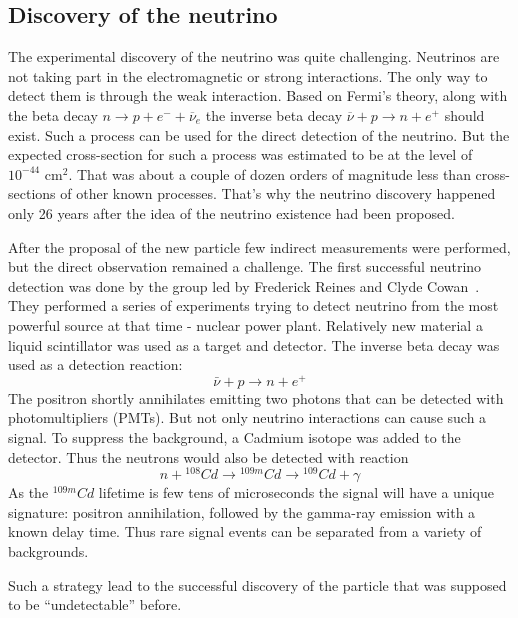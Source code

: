 \documentclass[../main.tex]{subfiles}
\begin{document}
\subsection{Discovery of the neutrino}
The experimental discovery of the neutrino was quite challenging. Neutrinos are not taking part in the electromagnetic or strong interactions. The only way to detect them is through the weak interaction. Based on Fermi's theory, along with the beta decay $n\to p+e^-+\overline{\nu}_e$ the inverse beta decay $\overline{\nu}+p\to n+e^+$ should exist. Such a process can be used for the direct detection of the neutrino. But the expected cross-section for such a process was estimated to be at the level of $10^{-44} \text{ cm}^2$. That was about a couple of dozen orders of magnitude less than cross-sections of other known processes. That's why the neutrino discovery happened only 26 years after the idea of the neutrino existence had been proposed.

After the proposal of the new particle few indirect measurements were performed, but the direct observation remained a challenge. The first successful neutrino detection was done by the group led by Frederick Reines and Clyde Cowan~\cite{Cowan1956}. They performed a series of experiments trying to detect neutrino from the most powerful source at that time - nuclear power plant. Relatively new material a liquid scintillator was used as a target and detector. The inverse beta decay was used as a detection reaction:
\begin{equation}
\bar{\nu}+p\to n+e^+
\end{equation}
The positron shortly annihilates emitting two photons that can be detected with photomultipliers (PMTs). But not only neutrino interactions can cause such a signal. To suppress the background, a Cadmium isotope was added to the detector. Thus the neutrons would also be detected with reaction
\begin{equation}
n+{}^{108}Cd\to{}^{109m}Cd\to{}^{109}Cd+\gamma
\end{equation}
As the ${}^{109m}Cd$ lifetime is few tens of microseconds the signal will have a unique signature: positron annihilation, followed by the gamma-ray emission with a known delay time. Thus rare signal events can be separated from a variety of backgrounds.

Such a strategy lead to the successful discovery of the particle that was supposed to be ``undetectable'' before.
\end{document}
